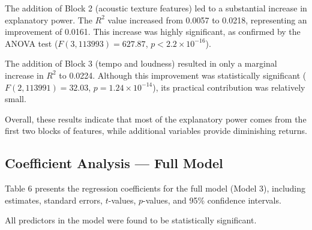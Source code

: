 \documentclass[12pt,a4paper]{article}
\begin{document}
The addition of Block 2 (acoustic texture features) led to a substantial
increase in explanatory power. The $R^2$ value increased from 0.0057 to
0.0218, representing an improvement of 0.0161. This increase was highly
significant, as confirmed by the ANOVA test
($F(3, 113993) = 627.87$, $p < 2.2 \times 10^{-16}$).

The addition of Block 3 (tempo and loudness) resulted in only a marginal
increase in $R^2$ to 0.0224. Although this improvement was statistically
significant ($F(2, 113991) = 32.03$, $p = 1.24 \times 10^{-14}$),
its practical contribution was relatively small.

Overall, these results indicate that most of the explanatory power comes
from the first two blocks of features, while additional variables provide
diminishing returns.


\subsection{Coefficient Analysis --- Full Model}

Table 6 presents the regression coefficients for the full
model (Model 3), including estimates, standard errors, $t$-values,
$p$-values, and 95\% confidence intervals.

All predictors in the model were found to be statistically significant.
\end{document}
